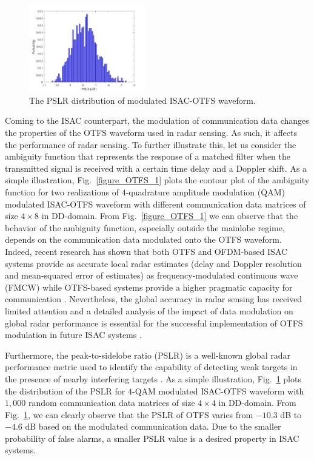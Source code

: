 \documentclass[journal, comsoc]{IEEEtran}
\begin{document}
\begin{figure}%
    \centering
    \includegraphics[width=0.45\textwidth]{Figures/PSLR_dB_OTFS_M_N_4_mean_7_8118.pdf}
    \captionsetup{justification=centering}
    \caption{The PSLR distribution of modulated ISAC-OTFS waveform.}
    \label{figure_OTFS_2}
    \vspace{-4mm}
\end{figure}


Coming to the ISAC counterpart, the modulation of communication data changes the properties of the OTFS waveform used in radar sensing. As such, it affects the performance of radar sensing. To further illustrate this, let us consider the ambiguity function that represents the response of a matched filter when the transmitted signal is received with a certain time delay and a Doppler shift. As a simple illustration, Fig.~\ref{figure_OTFS_1} plots the contour plot of the ambiguity function for two realizations of $4$-quadrature amplitude modulation (QAM) modulated ISAC-OTFS waveform with different communication data matrices of size $4\times 8$ in DD-domain. From Fig.~\ref{figure_OTFS_1} we can observe that the behavior of the ambiguity function, especially outside the mainlobe regime, depends on the communication data modulated onto the OTFS waveform. Indeed, recent research has shown that both OTFS and OFDM-based ISAC systems provide as accurate local radar estimates (delay and Doppler resolution and mean-squared error of estimates) as frequency-modulated continuous wave (FMCW) while OTFS-based systems provide a higher pragmatic capacity for communication \cite{2998583}. Nevertheless, the global accuracy in radar sensing has received limited attention and a detailed analysis of the impact of data modulation on global radar performance is essential for the successful implementation of OTFS modulation in future ISAC systems \cite{3209651}.

Furthermore, the peak-to-sidelobe ratio (PSLR) is a well-known global radar performance metric used to identify the capability of detecting weak targets in the presence of nearby interfering targets \cite{7507195}. As a simple illustration, Fig.~\ref{figure_OTFS_2} plots the distribution of the PSLR for $4$-QAM modulated ISAC-OTFS waveform with $1,000$ random communication data matrices of size $4\times 4$ in DD-domain. From Fig.~\ref{figure_OTFS_2}, we can clearly observe that the PSLR of OTFS varies from $-10.3$ dB to $-4.6$ dB based on the modulated communication data. Due to the smaller probability of false alarms, a smaller PSLR value is a desired property in ISAC systems. 
\end{document}
